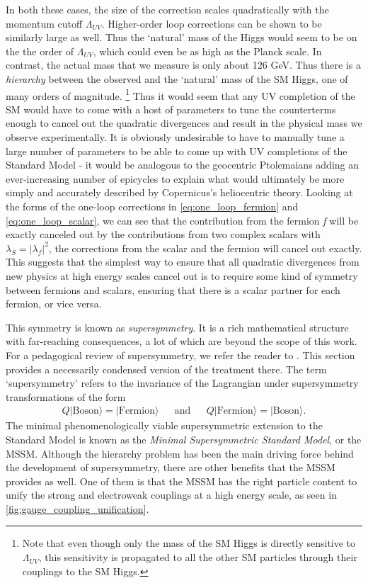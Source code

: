 \strictpagecheck
In both these cases, the size of the correction scales quadratically with the momentum cutoff $\Lambda_{UV}$. Higher-order loop corrections can be shown to be similarly large as well. Thus the `natural' mass of the Higgs would seem to be on the the order of $\Lambda_{UV}$, which could even be as high as the Planck scale. In contrast, the actual mass that we measure is only about 126 GeV. Thus there is a \emph{hierarchy} between the observed and the `natural' mass of the SM Higgs, one of many orders of magnitude. \footnote{Note that even though only the mass of the SM Higgs is directly sensitive to $\Lambda_{UV}$, this sensitivity is propagated to all the other SM particles through their couplings to the SM Higgs.}
Thus it would seem that any UV completion of the SM would have to come with a host of parameters to tune the counterterms enough to cancel out the quadratic divergences and result in the physical mass we observe experimentally.
It is obviously undesirable to have to manually tune a large number of parameters to be able to come up with UV completions of the Standard Model - it would be analogous to the geocentric Ptolemaians adding an ever-increasing number of epicycles to explain what would ultimately be more simply and accurately described by Copernicus's heliocentric theory. 
Looking at the forms of the one-loop corrections in \eqref{eq:one_loop_fermion} and \eqref{eq:one_loop_scalar}, we can see that the contribution from the fermion \emph{f} will be exactly canceled out by the contributions from two complex scalars with $\lambda_S = |\lambda_f|^2$, the corrections from the scalar and the fermion will cancel out exactly. This suggests that the simplest way to ensure that all quadratic divergences from new physics at high energy scales cancel out is to require some kind of symmetry between fermions and scalars, ensuring that there is a scalar partner for each fermion, or vice versa.

This symmetry is known as \emph{supersymmetry}. It is a rich mathematical structure with far-reaching consequences, a lot of which are beyond the scope of this work. For a pedagogical review of supersymmetry, we refer the reader to \citep{Martin1997}. This section provides a necessarily condensed version of the treatment there. 
The term `supersymmetry' refers to the invariance of the Lagrangian under supersymmetry transformations of the form
\begin{align*}
  Q|\text{Boson}\rangle = |\text{Fermion}\rangle &&\text{and}&& Q|\text{Fermion}\rangle = |\text{Boson}\rangle.
\end{align*}
The minimal phenomenologically viable supersymmetric extension to the Standard Model is known as the \emph{Minimal Supersymmetric Standard Model}, or the MSSM. Although the hierarchy problem has been the main driving force behind the development of supersymmetry, there are other benefits that the MSSM provides as well.
One of them is that the MSSM has the right particle content to unify the strong and electroweak couplings at a high energy scale, as seen in \autoref{fig:gauge_coupling_unification}.

